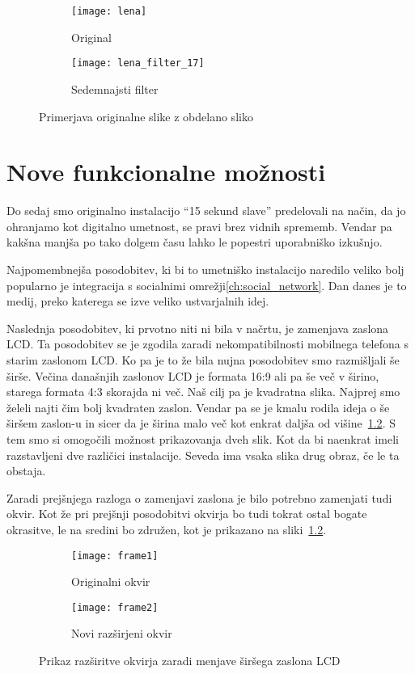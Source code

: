 \begin{figure}[!ht]
    \centering
    \begin{subfigure}[b]{0.4\textwidth}
        \texttt{[image: lena]}
        \caption{Original}
    \end{subfigure}
    \begin{subfigure}[b]{0.4\textwidth}
        \texttt{[image: lena\_filter\_17]}
        \caption{Sedemnajsti filter}
    \end{subfigure}
    \caption{Primerjava originalne slike z obdelano sliko}
    \label{fig:lena_filter_17}
\end{figure}


\chapter{Nove funkcionalne možnosti}
Do sedaj smo originalno instalacijo ``15 sekund slave'' predelovali na način,
da jo ohranjamo kot digitalno umetnost, se pravi brez vidnih sprememb. Vendar
pa kakšna manjša po tako dolgem času lahko le popestri uporabniško izkušnjo.

Najpomembnejša posodobitev, ki bi to umetniško instalacijo naredilo veliko
bolj popularno je integracija s socialnimi omrežji\ref{ch:social_network}.
Dan danes je to medij, preko katerega se izve veliko ustvarjalnih idej.

Naslednja posodobitev, ki prvotno niti ni bila v načrtu, je zamenjava zaslona
LCD. Ta posodobitev se je zgodila zaradi nekompatibilnosti mobilnega telefona
s starim zaslonom LCD. Ko pa je to že bila nujna posodobitev smo razmišljali
še širše. Večina današnjih zaslonov LCD je formata 16:9 ali pa še več v
širino, starega formata 4:3 skorajda ni več. Naš cilj pa je kvadratna slika.
Najprej smo želeli najti čim bolj kvadraten zaslon. Vendar pa se je kmalu
rodila ideja o še širšem zaslon-u in sicer da je širina malo več kot enkrat
daljša od višine~\ref{fig:frame2}. S tem smo si omogočili možnost prikazovanja dveh slik. Kot
da bi naenkrat imeli razstavljeni dve različici instalacije. Seveda ima vsaka
slika drug obraz, če le ta obstaja.

Zaradi prejšnjega razloga o zamenjavi zaslona je bilo potrebno zamenjati tudi
okvir. Kot že pri prejšnji posodobitvi okvirja bo tudi tokrat ostal bogate
okrasitve, le na sredini bo združen, kot je prikazano na
sliki~\ref{fig:frame2}.

\begin{figure}[!ht]
    \centering
    \begin{subfigure}[b]{0.33\textwidth}
        \texttt{[image: frame1]}
        \caption{Originalni okvir}
    \end{subfigure}
    \begin{subfigure}[b]{0.6\textwidth}
        \texttt{[image: frame2]}
        \caption{Novi razširjeni okvir}
        \label{fig:frame2}
    \end{subfigure}
    \caption{Prikaz razširitve okvirja zaradi menjave širšega zaslona LCD}
\end{figure}


